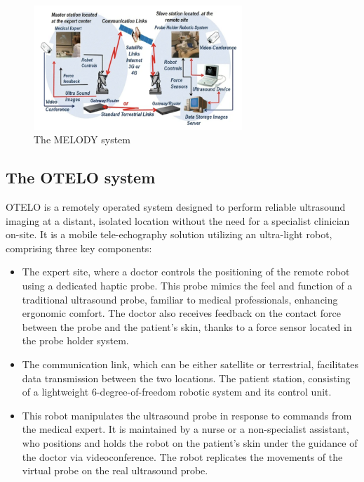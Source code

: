 \documentclass{article}
\begin{document}
\begin{figure}[h]
    \centering
    \includegraphics[width=0.7\textwidth]{MELODY.png}  
    \caption{The MELODY system}
    \label{fig:melody}
\end{figure}

\subsection{The OTELO system}
OTELO is a remotely operated system designed to perform reliable ultrasound imaging at a distant, isolated location without the need for a specialist clinician on-site. It is a mobile tele-echography solution utilizing an ultra-light robot, comprising three key components:


\begin{itemize}
\item The expert site, where a doctor controls the positioning of the remote robot using a dedicated haptic probe. This probe mimics the feel and function of a traditional ultrasound probe, familiar to medical professionals, enhancing ergonomic comfort. The doctor also receives feedback on the contact force between the probe and the patient's skin, thanks to a force sensor located in the probe holder system.
\item The communication link, which can be either satellite or terrestrial, facilitates data transmission between the two locations.
The patient station, consisting of a lightweight 6-degree-of-freedom robotic system and its control unit. \item This robot manipulates the ultrasound probe in response to commands from the medical expert. It is maintained by a nurse or a non-specialist assistant, who positions and holds the robot on the patient’s skin under the guidance of the doctor via videoconference. The robot replicates the movements of the virtual probe on the real ultrasound probe.
\end{itemize}
\end{document}
